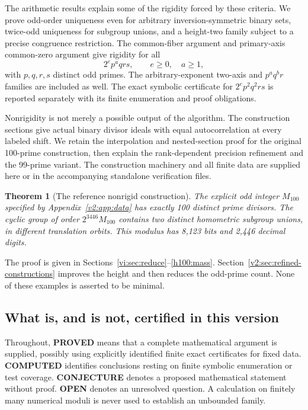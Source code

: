 \documentclass[11pt]{article}
\numberwithin{equation}{section}
\newtheorem{theorem}{Theorem}[section]
\theoremstyle{definition}
\theoremstyle{remark}
\begin{document}
The arithmetic results explain some of the rigidity forced by these criteria. We prove odd-order uniqueness even for arbitrary inversion-symmetric binary sets, twice-odd uniqueness for subgroup unions, and a height-two family subject to a precise congruence restriction. The common-fiber argument and primary-axis common-zero argument give rigidity for all
\[
 2^e p^a qrs,\qquad e\ge0,\quad a\ge1,
\]
with $p,q,r,s$ distinct odd primes. The arbitrary-exponent two-axis and $p^a q^b r$ families are included as well. The exact symbolic certificate for $2^e p^2q^2rs$ is reported separately with its finite enumeration and proof obligations.

Nonrigidity is not merely a possible output of the algorithm. The construction sections give actual binary divisor ideals with equal autocorrelation at every labeled shift. We retain the interpolation and nested-section proof for the original 100-prime construction, then explain the rank-dependent precision refinement and the 99-prime variant. The construction machinery and all finite data are supplied here or in the accompanying standalone verification files.

\begin{theorem}[The reference nonrigid construction]\label{vi:th:main}
The explicit odd integer $M_{100}$ specified by Appendix~\ref{v2:app:data} has exactly 100 distinct prime divisors. The cyclic group of order $2^{3446}M_{100}$ contains two distinct homometric subgroup unions, in different translation orbits. This modulus has 8,123 bits and 2,446 decimal digits.
\end{theorem}
The proof is given in Sections~\ref{vi:sec:reduce}--\ref{h100:mass}. Section~\ref{v2:sec:refined-constructions} improves the height and then reduces the odd-prime count. None of these examples is asserted to be minimal.

\subsection{What is, and is not, certified in this version}
Throughout, \textbf{PROVED} means that a complete mathematical argument is supplied, possibly using explicitly identified finite exact certificates for fixed data. \textbf{COMPUTED} identifies conclusions resting on finite symbolic enumeration or test coverage. \textbf{CONJECTURE} denotes a proposed mathematical statement without proof. \textbf{OPEN} denotes an unresolved question. A calculation on finitely many numerical moduli is never used to establish an unbounded family.
\end{document}
